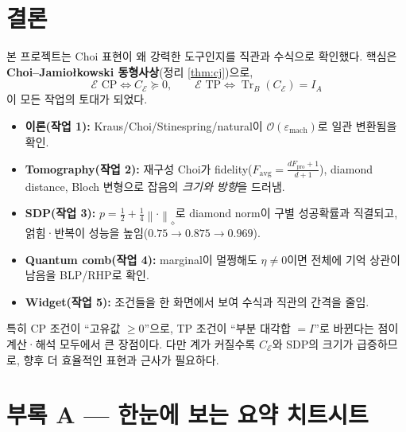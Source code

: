\documentclass[11pt,a4paper]{article}
\newcommand{\E}{\mathcal{E}}
\newcommand{\Tr}{\operatorname{Tr}}
\newcommand{\diamondnorm}[1]{\left\lVert #1 \right\rVert_{\diamond}}
\theoremstyle{definition}
\theoremstyle{plain}
\theoremstyle{remark}
\begin{document}
\section{결론}

본 프로젝트는 Choi 표현이 왜 강력한 도구인지를 직관과 수식으로 확인했다. 핵심은 \textbf{Choi--Jamio{\l}kowski 동형사상}(정리 \ref{thm:cj})으로,
\[
\E\text{ CP}\iff C_\E\succeq0,\qquad \E\text{ TP}\iff\Tr_B(C_\E)=I_A
\]
이 모든 작업의 토대가 되었다.

\begin{itemize}
  \item \textbf{이론(작업 1):} Kraus/Choi/Stinespring/natural이 $\mathcal O(\varepsilon_{\mathrm{mach}})$로 일관 변환됨을 확인.
  \item \textbf{Tomography(작업 2):} 재구성 Choi가 fidelity($F_{\mathrm{avg}}=\frac{dF_{\mathrm{pro}}+1}{d+1}$), diamond distance, Bloch 변형으로 잡음의 \emph{크기와 방향}을 드러냄.
  \item \textbf{SDP(작업 3):} $p=\tfrac12+\tfrac14\diamondnorm{\cdot}$로 diamond norm이 구별 성공확률과 직결되고, 얽힘·반복이 성능을 높임($0.75\to0.875\to0.969$).
  \item \textbf{Quantum comb(작업 4):} marginal이 멀쩡해도 $\eta\neq0$이면 전체에 기억 상관이 남음을 BLP/RHP로 확인.
  \item \textbf{Widget(작업 5):} 조건들을 한 화면에서 보여 수식과 직관의 간격을 줄임.
\end{itemize}

특히 CP 조건이 ``고유값 $\ge0$''으로, TP 조건이 ``부분 대각합 $=I$''로 바뀐다는 점이 계산·해석 모두에서 큰 장점이다. 다만 계가 커질수록 $C_\E$와 SDP의 크기가 급증하므로, 향후 더 효율적인 표현과 근사가 필요하다.

\appendix
\section{부록 A --- 한눈에 보는 요약 치트시트}
\end{document}
